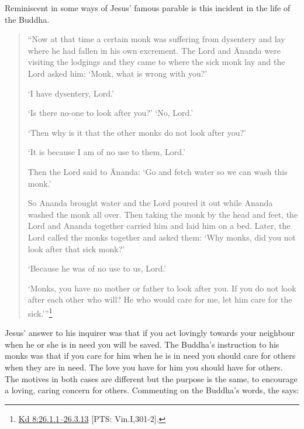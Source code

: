\documentclass[10pt, openright]{book}
\begin{document}
Reminiscent in some ways of Jesus’ famous parable is this incident in the life of the Buddha.


\begin{quote}

\hspace{-0.4em}“Now at that time a certain monk was suffering from dysentery and lay where he had fallen in his own excrement. The Lord and Ānanda were visiting the lodgings and they came to where the sick monk lay and the Lord asked him: ‘Monk, what is wrong with you?’

‘I have dysentery, Lord.’

‘Is there no-one to look after you?’ ‘No, Lord.’

‘Then why is it that the other monks do not look after you?’

‘It is because I am of no use to them, Lord.’

Then the Lord said to Ānanda: ‘Go and fetch water so we can wash this monk.’

So Ananda brought water and the Lord poured it out while Ananda washed the monk all over. Then taking the monk by the head and feet, the Lord and Ananda together carried him and laid him on a bed. Later, the Lord called the monks together and asked them: ‘Why monks, did you not look after that sick monk?’

‘Because he was of no use to us, Lord.’

‘Monks, you have no mother or father to look after you. If you do not look after each other who will? He who would care for me, let him care for the sick.’”\footnote {\href{https://suttacentral.net/pli-tv-kd8/en/brahmali#26.1.1}{Kd 8:26.1.1–26.3.13} [PTS: Vin.I,301-2].}


\end{quote}
Jesus’ answer to his inquirer was that if you act lovingly towards your neighbour when he or she is in need you will be saved. The Buddha’s instruction to his monks was that if you care for him when he is in need you should care for others when they are in need. The love you have for him you should have for others. The motives in both cases are different but the purpose is the same, to encourage a loving, caring concern for others. Commenting on the Buddha’s words, the \cite{Saddhammopāyana} says:
\end{document}
